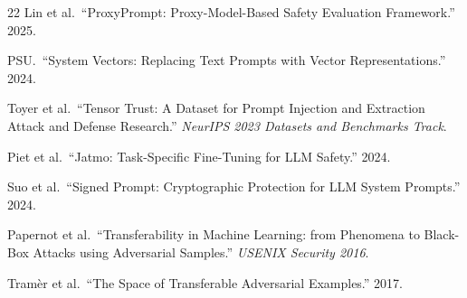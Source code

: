 \documentclass[11pt,a4paper]{ctexart}
\begin{document}
\begin{thebibliography}{22}
Lin et al.\ ``ProxyPrompt: Proxy-Model-Based Safety Evaluation Framework.'' 2025.

PSU.\ ``System Vectors: Replacing Text Prompts with Vector Representations.'' 2024.

Toyer et al.\ ``Tensor Trust: A Dataset for Prompt Injection and Extraction Attack and Defense Research.''
\textit{NeurIPS 2023 Datasets and Benchmarks Track}.

Piet et al.\ ``Jatmo: Task-Specific Fine-Tuning for LLM Safety.'' 2024.

Suo et al.\ ``Signed Prompt: Cryptographic Protection for LLM System Prompts.'' 2024.

Papernot et al.\ ``Transferability in Machine Learning: from Phenomena to Black-Box Attacks using Adversarial Samples.''
\textit{USENIX Security 2016}.

Tram\`{e}r et al.\ ``The Space of Transferable Adversarial Examples.'' 2017.

\end{thebibliography}
\end{document}
